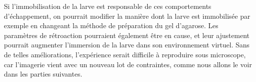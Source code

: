 Si l'immobilisation de la larve est responsable de ces comportements d'échappement, on pourrait modifier la manière dont la larve est immobilisée par exemple en changeant la méthode de préparation du gel d'agarose. Les paramètres de rétroaction pourraient également être en cause, et leur ajustement pourrait augmenter l'immersion de la larve dans son environnement virtuel. Sans de telles améliorations, l'expérience serait difficile à reproduire sous microscope, car l'imagerie vient avec un nouveau lot de contraintes, comme nous allons le voir dans les parties suivantes.


